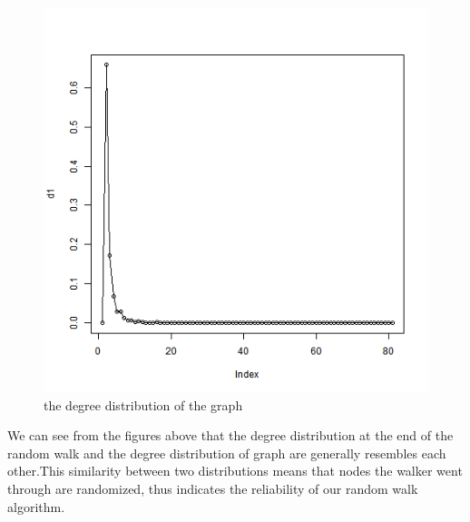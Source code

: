 \documentclass{article}
\begin{document}
\begin{figure}[htbp]
\centering
\includegraphics[width=.6\textwidth]{Q2a_1.png}
\caption{the degree distribution of the graph}
\label{fig:p2_e2}
\end{figure}
\noindent We can see from the figures above that the degree distribution at the end of the random walk and the degree distribution of graph are generally resembles each other.This similarity between two distributions means that nodes the walker went through are randomized, thus indicates the reliability of our random walk algorithm.
\end{document}
